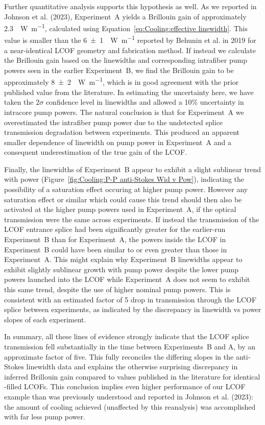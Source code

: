 Further quantitative analysis supports this hypothesis as well. As we reported in Johnson et al. (2023)\cite{johnson2023laser}, Experiment~A yields a Brillouin gain of approximately \SI{2.3}{\per\watt\per\meter}, calculated using Equation~\ref{eq:Cooling:effective linewidth}. This value is smaller than the \SI{6(1)}{\per\watt\per\meter} reported by Behunin et al. in 2019\cite{behunin2019spontaneous} for a near‐identical \ac{LCOF} geometry and fabrication method. If instead we calculate the Brillouin gain based on the linewidths and corresponding intrafiber pump powers seen in the earlier Experiment~B, we find the Brillouin gain to be approximately \SI{8(2)}{\per\watt\per\meter}, which is in good agreement with the prior published value from the literature. In estimating the uncertainty here, we have taken the \(2\sigma\) confidence level in linewidths and allowed a 10\% uncertainty in intracore pump powers. The natural conclusion is that for Experiment~A we overestimated the intrafiber pump power due to the undetected splice transmission degradation between experiments. This produced an apparent smaller dependence of linewidth on pump power in Experiment~A and a consequent underestimation of the true gain of the \ac{LCOF}.

Finally, the linewidths of Experiment~B appear to exhibit a slight sublinear trend with power (Figure~\ref{fig:Cooling:P-P anti-Stokes Wid v Pow}), indicating the possibility of a saturation effect occuring at higher pump power. However any saturation effect or similar which could cause this trend should then also be activated at the higher pump powers used in Experiment~A, if the optical transmission were the same across experiments. If instead the transmission of the \ac{LCOF} entrance splice had been significantly greater for the earlier-run Experiment~B than for Experiment~A, the powers inside the \ac{LCOF} in Experiment~B could have been similar to or even greater than those in Experiment~A. This might explain why Experiment~B linewidths appear to exhibit slightly sublinear growth with pump power despite the lower pump powers launched into the \ac{LCOF} while Experiment~A does not seem to exhibit this same trend, despite the use of higher nominal pump powers. This is consistent with an estimated factor of 5 drop in transmission through the \ac{LCOF} splice between experiments, as indicated by the discrepancy in linewidth vs power slopes of each experiment.

In summary, all these lines of evidence strongly indicate that the \ac{LCOF} splice transmission fell substantially in the time between Experiments~B and A, by an approximate factor of five. This fully reconciles the differing slopes in the anti‐Stokes linewidth data and explains the otherwise surprising discrepancy in inferred Brillouin gain compared to values published in the literature for identical -filled \ac{LCOF}s. This conclusion implies even higher performance of our \ac{LCOF} example than was previously understood and reported in Johnson et al. (2023)\cite{johnson2023laser}: the amount of cooling achieved (unaffected by this reanalysis) was accomplished with far less pump power.

